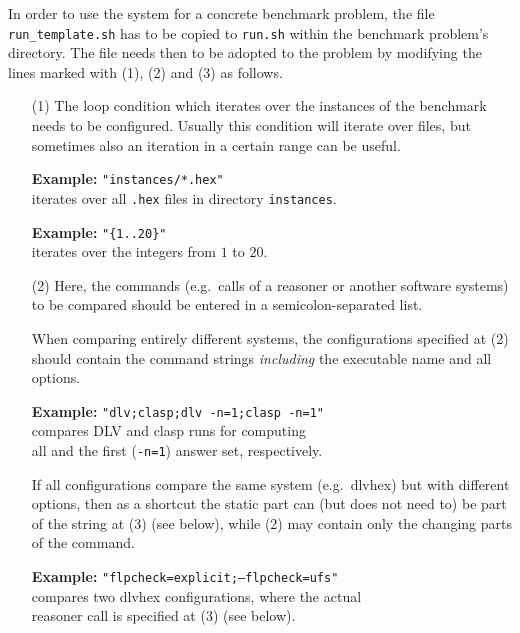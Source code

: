 \documentclass[a4paper]{article}
\newcommand{\dlvhex}{{\sc dlvhex}}
\begin{document}
		In order to use the system for a concrete benchmark problem,
		the file {\tt run\_template.sh}
		has to be copied to {\tt run.sh} within the benchmark problem's directory.
		The file needs then to be adopted to the problem by modifying the lines
		marked with (1), (2) and (3) as follows.
		\begin{enumerate}
		\item[(1)] The loop condition which iterates over the instances of the benchmark needs to be configured.
			Usually this condition will iterate over files, but sometimes also an iteration in a certain range can be useful.

			\begin{tabbing}
				\textbf{Example: } \= {\tt "instances/*.hex"} \\
				\> iterates over all {\tt .hex} files in directory {\tt instances}.
			\end{tabbing}

			\begin{tabbing}
				\textbf{Example: } \= {\tt "\{1..20\}"} \\
				\> iterates over the integers from $1$ to $20$.
			\end{tabbing}
		\item[(2)] Here, the commands (e.g.~calls of a reasoner or another software systems) to be compared should be entered in a semicolon-separated list.

			When comparing entirely different systems,
			the configurations specified at (2) should contain the command strings \emph{including} the executable name and all options.

			\begin{tabbing}
				\textbf{Example: } \= {\tt "dlv;clasp;dlv -n=1;clasp -n=1"} \\
				\> compares {\sc DLV} and {\sc clasp} runs for computing \\
				\> all and the first ({\tt -n=1}) answer set, respectively.
			\end{tabbing}

			If all configurations compare the same system (e.g.~\dlvhex{}) but with different options,
			then as a shortcut the static part can (but does not need to) be part of the string at
			(3) (see below), while (2) may contain only the changing parts of the command.

			\begin{tabbing}
				\textbf{Example: } \= {\tt "flpcheck=explicit;--flpcheck=ufs"} \\
				\> compares two \dlvhex{} configurations, where the actual \\
				\> reasoner call is specified at (3) (see below).
			\end{tabbing}


\end{enumerate}
\end{document}
